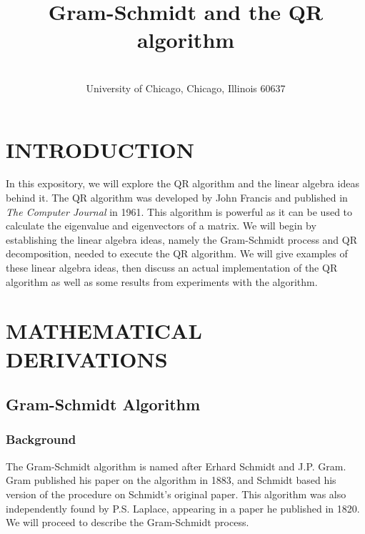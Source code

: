 \documentclass[onecolumn]{webofc}
\begin{document}
%
\title{Gram-Schmidt and the QR algorithm}
%
%

\author{ \\\small{University of Chicago, Chicago, Illinois 60637}
}

\abstract{%

}
%
\maketitle
%
\section{INTRODUCTION}
\label{intro}
In this expository, we will explore the QR algorithm and the linear algebra ideas behind it. The QR algorithm was developed by John Francis and published in \textit{The Computer Journal} in 1961\cite{RefA}.  This algorithm is powerful as it can be used to calculate the eigenvalue and eigenvectors of a matrix. We will begin by establishing the linear algebra ideas, namely the Gram-Schmidt process and QR decomposition, needed to execute the QR algorithm. We will give examples of these linear algebra ideas, then discuss an actual implementation of the QR algorithm as well as some results from experiments with the algorithm.


\section{MATHEMATICAL DERIVATIONS}
\subsection{Gram-Schmidt Algorithm}
\subsubsection*{Background}
The Gram-Schmidt algorithm is named after Erhard Schmidt and J.P. Gram. Gram published his paper on the algorithm in 1883, and Schmidt based his version of the procedure on Schmidt's original paper. This algorithm was also independently found by P.S. Laplace, appearing in a paper he published in 1820. We will proceed to describe the Gram-Schmidt process.
\end{document}
